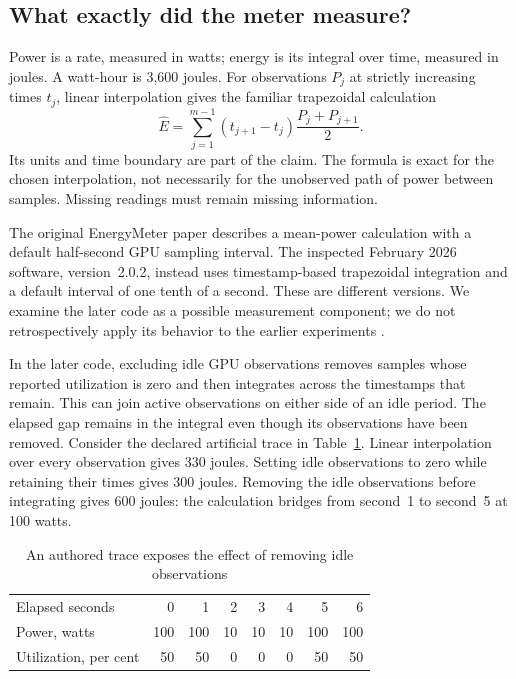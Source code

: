 \subsection{What exactly did the meter measure?}

Power is a rate, measured in watts; energy is its integral over time,
measured in joules. A watt-hour is 3,600 joules. For observations $P_j$ at
strictly increasing times $t_j$, linear interpolation gives the familiar
trapezoidal calculation
\begin{equation}
 \widehat E=\sum_{j=1}^{m-1}
        (t_{j+1}-t_j)\frac{P_j+P_{j+1}}2.
 \label{closure:energy-trapezoid}
\end{equation}
Its units and time boundary are part of the claim. The formula is exact for
the chosen interpolation, not necessarily for the unobserved path of power
between samples. Missing readings must remain missing information.

The original EnergyMeter paper describes a mean-power calculation with a
default half-second GPU sampling interval. The inspected February 2026
software, version~2.0.2, instead uses timestamp-based trapezoidal integration
and a default interval of one tenth of a second. These are different
versions. We examine the later code as a possible measurement component;
we do not retrospectively apply its behavior to the earlier experiments
\citep{closureEnergyMeter2026}.

In the later code, excluding idle GPU observations removes samples whose
reported utilization is zero and then integrates across the timestamps that
remain. This can join active observations on either side of an idle period.
The elapsed gap remains in the integral even though its observations have
been removed. Consider the declared artificial trace in
Table~\ref{closure:energy-trace}. Linear interpolation over every observation
gives 330 joules. Setting idle observations to zero while retaining their
times gives 300 joules. Removing the idle observations before integrating
gives 600 joules: the calculation bridges from second~1 to second~5 at
100 watts.

\begin{table}[htbp]
\centering\small
\caption{An authored trace exposes the effect of removing idle observations}
\label{closure:energy-trace}
\begin{tabular}{lrrrrrrr}
\toprule
Elapsed seconds & 0&1&2&3&4&5&6\\
Power, watts &100&100&10&10&10&100&100\\
Utilization, per cent &50&50&0&0&0&50&50\\
\bottomrule
\end{tabular}
\end{table}

